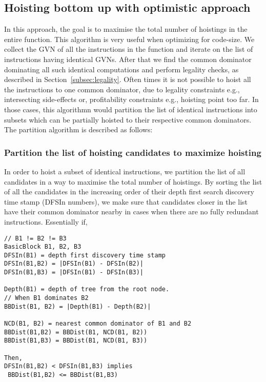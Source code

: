 \documentclass{sig-alternate}
\begin{document}
\subsection{Hoisting bottom up with optimistic approach}
\label{subsec:optimistic}
In this approach, the goal is to maximise the total number of hoistings in the
entire function.  This algorithm is very useful when optimizing for code-size.
We collect the GVN of all the instructions in the function and iterate on the
list of instructions having identical GVNs. After that we find the common
dominator dominating all such identical computations and perform legality
checks, as described in Section~\ref{subsec:legality}. Often times it is not
possible to hoist all the instructions to one common dominator, due to legality
constraints e.g., intersecting side-effects or, profitability constraints e.g.,
hoisting point too far. In those cases, this algorithmn would partition the list
of identical instructions into subsets which can be partially hoisted to their
respective common dominators. The partition algorithm is described as follows:

\subsubsection{Partition the list of hoisting candidates to maximize hoisting}
\label{subsec:partition}
In order to hoist a subset of identical instructions, we partition the list of
all candidates in a way to maximise the total number of hoistings.  By sorting
the list of all the candidates in the increasing order of their depth first
search discovery time stamp \cite{clrs} (DFSIn numbers), we make sure that
candidates closer in the list have their common dominator nearby in cases when
there are no fully redundant instructions. Essentially if,

\begin{verbatim}
// B1 != B2 != B3
BasicBlock B1, B2, B3
DFSIn(B1) = depth first discovery time stamp
DFSIn(B1,B2) = |DFSIn(B1) - DFSIn(B2)|
DFSIn(B1,B3) = |DFSIn(B1) - DFSIn(B3)|

Depth(B1) = depth of tree from the root node.
// When B1 dominates B2
BBDist(B1, B2) = |Depth(B1) - Depth(B2)|

NCD(B1, B2) = nearest common dominator of B1 and B2
BBDist(B1,B2) = BBDist(B1, NCD(B1, B2))
BBDist(B1,B3) = BBDist(B1, NCD(B1, B3))

Then,
DFSIn(B1,B2) < DFSIn(B1,B3) implies
 BBDist(B1,B2) <= BBDist(B1,B3)
\end{verbatim}
\end{document}
